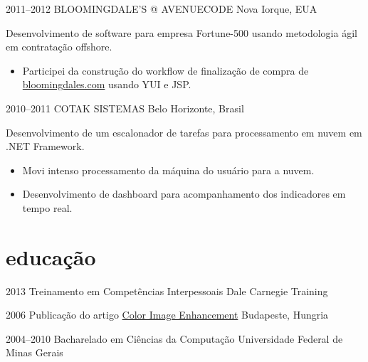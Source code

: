 \documentclass[]{friggeri-cv}
\begin{document}
\begin{entrylist}
\entry
{2011--2012}
{BLOOMINGDALE'S @ AVENUECODE}
{Nova Iorque, EUA}
{ Desenvolvimento de software para empresa Fortune-500 usando metodologia ágil em contratação offshore.

  \begin{itemize}
    \item Participei da construção do workflow de finalização de compra de \href{http://www.bloomingdales.com}{bloomingdales.com} usando YUI e JSP.
  \end{itemize}
}

\entry
{2010--2011}
{COTAK SISTEMAS}
{Belo Horizonte, Brasil}
{ Desenvolvimento de um escalonador de tarefas para processamento em nuvem em .NET Framework.

  \begin{itemize}
    \item Movi intenso processamento da máquina do usuário para a nuvem.
    \item Desenvolvimento de dashboard para acompanhamento dos indicadores em tempo real.
  \end{itemize}
}

%

\end{entrylist}

\section{educação}
\begin{entrylist}
	\entry
	{2013}
	{{\normalfont Treinamento em} Competências Interpessoais}
	{Dale Carnegie Training}
	
	\entry
	{2006}
	{{\normalfont Publicação do artigo}  \href{http://goo.gl/iwGso6}{Color Image Enhancement}}
	{Budapeste, Hungria}

	\entry
	{2004--2010}
	{{\normalfont Bacharelado em} Ciências da Computação}
	{Universidade Federal de Minas Gerais}
	
\end{entrylist}
\end{document}
